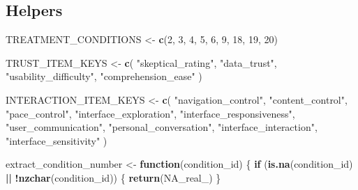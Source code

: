 \documentclass[
]{article}
\newenvironment{Shaded}{\begin{snugshade}}{\end{snugshade}}
\newcommand{\AttributeTok}[1]{\textcolor[rgb]{0.13,0.29,0.53}{#1}}
\newcommand{\ConstantTok}[1]{\textcolor[rgb]{0.56,0.35,0.01}{#1}}
\newcommand{\ControlFlowTok}[1]{\textcolor[rgb]{0.13,0.29,0.53}{\textbf{#1}}}
\newcommand{\DecValTok}[1]{\textcolor[rgb]{0.00,0.00,0.81}{#1}}
\newcommand{\FunctionTok}[1]{\textcolor[rgb]{0.13,0.29,0.53}{\textbf{#1}}}
\newcommand{\NormalTok}[1]{#1}
\newcommand{\OtherTok}[1]{\textcolor[rgb]{0.56,0.35,0.01}{#1}}
\newcommand{\SpecialCharTok}[1]{\textcolor[rgb]{0.81,0.36,0.00}{\textbf{#1}}}
\newcommand{\StringTok}[1]{\textcolor[rgb]{0.31,0.60,0.02}{#1}}
\begin{document}
\begin{Shaded}
\end{Shaded}

\subsection{Helpers}\label{helpers}

\begin{Shaded}
\begin{Highlighting}[]
\NormalTok{TREATMENT\_CONDITIONS }\OtherTok{\textless{}{-}} \FunctionTok{c}\NormalTok{(}\DecValTok{2}\NormalTok{, }\DecValTok{3}\NormalTok{, }\DecValTok{4}\NormalTok{, }\DecValTok{5}\NormalTok{, }\DecValTok{6}\NormalTok{, }\DecValTok{9}\NormalTok{, }\DecValTok{18}\NormalTok{, }\DecValTok{19}\NormalTok{, }\DecValTok{20}\NormalTok{)}

\NormalTok{TRUST\_ITEM\_KEYS }\OtherTok{\textless{}{-}} \FunctionTok{c}\NormalTok{(}
  \StringTok{"skeptical\_rating"}\NormalTok{,}
  \StringTok{"data\_trust"}\NormalTok{,}
  \StringTok{"usability\_difficulty"}\NormalTok{,}
  \StringTok{"comprehension\_ease"}
\NormalTok{)}

\NormalTok{INTERACTION\_ITEM\_KEYS }\OtherTok{\textless{}{-}} \FunctionTok{c}\NormalTok{(}
  \StringTok{"navigation\_control"}\NormalTok{,}
  \StringTok{"content\_control"}\NormalTok{,}
  \StringTok{"pace\_control"}\NormalTok{,}
  \StringTok{"interface\_exploration"}\NormalTok{,}
  \StringTok{"interface\_responsiveness"}\NormalTok{,}
  \StringTok{"user\_communication"}\NormalTok{,}
  \StringTok{"personal\_conversation"}\NormalTok{,}
  \StringTok{"interface\_interaction"}\NormalTok{,}
  \StringTok{"interface\_sensitivity"}
\NormalTok{)}

\NormalTok{extract\_condition\_number }\OtherTok{\textless{}{-}} \ControlFlowTok{function}\NormalTok{(condition\_id) \{}
  \ControlFlowTok{if}\NormalTok{ (}\FunctionTok{is.na}\NormalTok{(condition\_id) }\SpecialCharTok{||} \SpecialCharTok{!}\FunctionTok{nzchar}\NormalTok{(condition\_id)) \{}
    \FunctionTok{return}\NormalTok{(}\ConstantTok{NA\_real\_}\NormalTok{)}
\NormalTok{  \}}


\end{Highlighting}
\end{Shaded}
\end{document}
